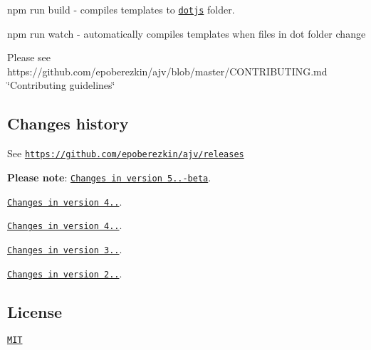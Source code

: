 {\ttfamily npm run build} -\/ compiles templates to \href{https://github.com/epoberezkin/ajv/tree/master/lib/dotjs}{\tt dotjs} folder.

{\ttfamily npm run watch} -\/ automatically compiles templates when files in dot folder change

Please see https\+://github.com/epoberezkin/ajv/blob/master/\+C\+O\+N\+T\+R\+I\+B\+U\+T\+I\+N\+G.\+md \char`\"{}\+Contributing guidelines\char`\"{}

\subsection*{Changes history}

See \href{https://github.com/epoberezkin/ajv/releases}{\tt https\+://github.\+com/epoberezkin/ajv/releases}

{\bfseries Please note}\+: \href{https://github.com/epoberezkin/ajv/releases/tag/5.0.1-beta.0}{\tt Changes in version 5..-\/beta}.

\href{https://github.com/epoberezkin/ajv/releases/tag/4.6.0}{\tt Changes in version 4..}.

\href{https://github.com/epoberezkin/ajv/releases/tag/4.0.0}{\tt Changes in version 4..}.

\href{https://github.com/epoberezkin/ajv/releases/tag/3.0.0}{\tt Changes in version 3..}.

\href{https://github.com/epoberezkin/ajv/releases/tag/2.0.0}{\tt Changes in version 2..}.

\subsection*{License}

\href{https://github.com/epoberezkin/ajv/blob/master/LICENSE}{\tt M\+IT} 